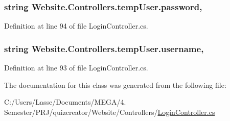 \subsubsection[{password}]{\setlength{\rightskip}{0pt plus 5cm}string Website.\+Controllers.\+temp\+User.\+password\hspace{0.3cm}{\ttfamily [get]}, {\ttfamily [set]}}\label{class_website_1_1_controllers_1_1temp_user_a04df23ef3edb53782d266efcee34d660}


Definition at line 94 of file Login\+Controller.\+cs.

\hypertarget{class_website_1_1_controllers_1_1temp_user_a19be273f405562c4fe86e8a5effba79a}{}
\subsubsection[{username}]{\setlength{\rightskip}{0pt plus 5cm}string Website.\+Controllers.\+temp\+User.\+username\hspace{0.3cm}{\ttfamily [get]}, {\ttfamily [set]}}\label{class_website_1_1_controllers_1_1temp_user_a19be273f405562c4fe86e8a5effba79a}


Definition at line 93 of file Login\+Controller.\+cs.



The documentation for this class was generated from the following file\+:\begin{DoxyCompactItemize}
\item 
C\+:/\+Users/\+Lasse/\+Documents/\+M\+E\+G\+A/4. Semester/\+P\+R\+J/quizcreator/\+Website/\+Controllers/\hyperlink{_login_controller_8cs}{Login\+Controller.\+cs}\end{DoxyCompactItemize}
